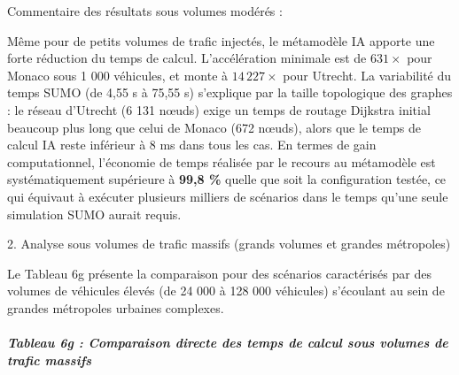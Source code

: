 \documentclass[10pt, a4paper]{article}
\begin{document}
Commentaire des résultats sous volumes modérés :

Même pour de petits volumes de trafic injectés, le métamodèle IA apporte
une forte réduction du temps de calcul. L'accélération minimale est de
\(631\times\) pour Monaco sous 1 000 véhicules, et monte à
\(14\,227\times\) pour Utrecht. La variabilité du temps SUMO (de 4,55 s
à 75,55 s) s'explique par la taille topologique des graphes : le réseau
d'Utrecht (6 131 nœuds) exige un temps de routage Dijkstra initial
beaucoup plus long que celui de Monaco (672 nœuds), alors que le temps
de calcul IA reste inférieur à 8 ms dans tous les cas. En termes de gain
computationnel, l'économie de temps réalisée par le recours au
métamodèle est systématiquement supérieure à \textbf{99,8 \%} quelle que
soit la configuration testée, ce qui équivaut à exécuter plusieurs
milliers de scénarios dans le temps qu'une seule simulation SUMO aurait
requis.

2. Analyse sous volumes de trafic massifs (grands volumes et grandes
métropoles)

Le Tableau 6g présente la comparaison pour des scénarios caractérisés
par des volumes de véhicules élevés (de 24 000 à 128 000 véhicules)
s'écoulant au sein de grandes métropoles urbaines complexes.

\subparagraph{Tableau 6g : Comparaison directe des temps de calcul sous
volumes de trafic
massifs}\label{tableau-6g-comparaison-directe-des-temps-de-calcul-sous-volumes-de-trafic-massifs}
\end{document}
